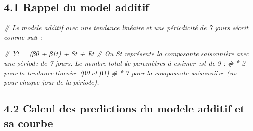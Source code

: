\documentclass[
]{article}
\newenvironment{Shaded}{\begin{snugshade}}{\end{snugshade}}
\newcommand{\CommentTok}[1]{\textcolor[rgb]{0.56,0.35,0.01}{\textit{#1}}}
\begin{document}
\subsection{4.1 Rappel du model additif}\label{rappel-du-model-additif}

\begin{Shaded}
\begin{Highlighting}[]
\CommentTok{\# Le modèle additif avec une tendance linéaire et une périodicité de 7 jours s\textquotesingle{}écrit comme suit :}

\CommentTok{\# Yt = (β0 + β1t) + St + Et }
\CommentTok{\# Ou St représente la composante saisonnière avec une période de 7 jours. Le nombre total de paramètres à estimer est de 9 :}
\CommentTok{\# * 2 pour la tendance lineaire (β0 et β1)}
\CommentTok{\# * 7 pour la composante saisonnière (un pour chaque jour de la période).}
\end{Highlighting}
\end{Shaded}

\subsection{4.2 Calcul des predictions du modele additif et sa
courbe}\label{calcul-des-predictions-du-modele-additif-et-sa-courbe}
\end{document}
